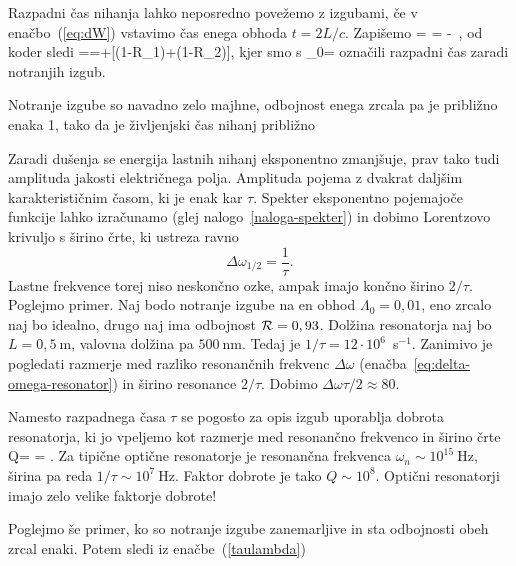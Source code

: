 Razpadni čas nihanja lahko neposredno povežemo z izgubami, če v enačbo~(\ref{eq:dW})
vstavimo čas enega obhoda $t=2L/c$. Zapišemo
\beq
{}= \Lambda = -\, ,
\eeq
od koder sledi
\beq
{}==+[(1-{\cal R}_{1})+(1-{\cal R}_{2})],
\label{taulambda}
\eeq
kjer smo s 
\beq
\tau_{0}=
\eeq
označili razpadni čas zaradi notranjih izgub. 

Notranje izgube so navadno zelo majhne, odbojnost enega zrcala
pa je približno enaka 1, tako da je življenjski čas nihanj približno

Zaradi dušenja se energija lastnih nihanj eksponentno zmanjšuje, prav tako tudi
amplituda jakosti električnega polja. Amplituda pojema z dvakrat daljšim 
karakterističnim časom, ki je enak kar $\tau$. Spekter eksponentno pojemajoče funkcije lahko izračunamo
(glej nalogo~\ref{naloga-spekter}) in dobimo Lorentzovo krivuljo 
s širino črte, ki ustreza ravno
\begin{equation}
\Delta\omega_{1/2}=\frac{1}{\tau}.
\label{3.26}
\end{equation}
Lastne frekvence torej niso neskončno ozke, ampak imajo končno širino $2/\tau$.
Poglejmo primer. Naj bodo notranje izgube na en obhod $\Lambda_0=0,01$,
eno zrcalo naj bo idealno, drugo naj ima odbojnost ${\cal R}=0,93$. Dolžina
resonatorja naj bo $L=0,5~\si{\metre}$, valovna dolžina pa $500~\si{\nano\metre}$. Tedaj
je $1/\tau=12\cdot10^{6}$~s$^{-1}$. Zanimivo je pogledati razmerje med 
razliko resonančnih frekvenc $\Delta \omega$ 
(enačba~\ref{eq:delta-omega-resonator}) in širino resonance $2/\tau$. 
Dobimo $\Delta\omega\tau/2 \approx 80$.

\begin{remark}
Namesto razpadnega časa $\tau$ se pogosto za opis izgub uporablja
dobrota resonatorja, ki jo vpeljemo kot
razmerje med resonančno frekvenco in širino črte 
\beq
Q= = .
\eeq
Za tipične optične resonatorje je resonančna 
frekvenca $\omega_n \sim 10^{15}~\si{\hertz}$, širina pa reda 
 $1/\tau \sim 10^{7}~\si{\hertz}$. Faktor dobrote je tako $Q \sim 10^{8}$. Optični 
 resonatorji imajo zelo velike faktorje dobrote!
\end{remark}

Poglejmo še primer, ko so notranje izgube zanemarljive in sta odbojnosti obeh zrcal enaki.
Potem sledi iz enačbe~(\ref{taulambda})

